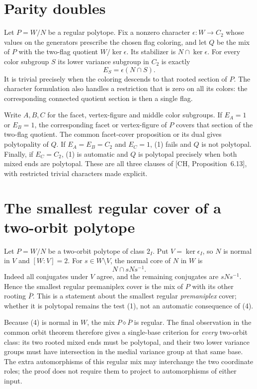\documentclass[a4paper,11pt]{article}
\newcommand{\mix}{\mathbin{\diamond}}\newcommand{\Alt}{\operatorname{Alt}}
\begin{document}


\section{Parity doubles}
Let $P=W/N$ be a regular polytope. Fix a nonzero character
$\epsilon:W\to C_2$ whose values on the generators prescribe the chosen
flag coloring, and let $Q$ be the mix of $P$ with the two-flag quotient
$W/\ker\epsilon$. Its stabilizer is $N\cap\ker\epsilon$.
For every color subgroup $S$ its lower variance subgroup in $C_2$ is
exactly
\[
 E_S=\epsilon(N\cap S).                                    \tag{3}
\]
It is trivial precisely when the coloring descends to that rooted section
of $P$. The character formulation also handles a restriction that is
zero on all its colors: the corresponding connected quotient section is
then a single flag.

Write $A,B,C$ for the facet, vertex-figure and middle color subgroups.
If $E_A=1$ or $E_B=1$, the corresponding facet or vertex-figure of $P$
covers that section of the two-flag quotient. The common facet-cover
proposition or its dual gives polytopality of $Q$.
If $E_A=E_B=C_2$ and $E_C=1$, (1) fails and $Q$ is not polytopal.
Finally, if $E_C=C_2$, (1) is automatic and $Q$ is polytopal precisely
when both mixed ends are polytopal. These are all three clauses of
[CH, Proposition~6.13], with restricted trivial characters made explicit.

\section{The smallest regular cover of a two-orbit polytope}
Let $P=W/N$ be a two-orbit polytope of class $2_I$. Put
$V=\ker\epsilon_I$, so $N$ is normal in $V$ and $[W:V]=2$.
For $s\in W\setminus V$, the normal core of $N$ in $W$ is
\[
 N\cap sNs^{-1}.                                          \tag{4}
\]
Indeed all conjugates under $V$ agree, and the remaining conjugates are
$sNs^{-1}$. Hence the smallest regular premaniplex cover is the mix of
$P$ with its other rooting $\overline P$. This is a statement about the
smallest regular \emph{premaniplex} cover; whether it is polytopal remains
the test (1), not an automatic consequence of (4).

Because (4) is normal in $W$, the mix $P\mix\overline P$ is regular.
The final observation in the common orbit theorem therefore gives a
single-base criterion for \emph{every} two-orbit class: its two rooted
mixed ends must be polytopal, and their two lower variance groups must
have intersection in the medial variance group at that same base.
The extra automorphisms of this regular mix may interchange the two
coordinate roles; the proof does not require them to project to
automorphisms of either input.
\end{document}
